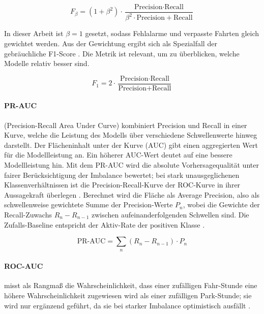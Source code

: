 \begin{equation}
  F_\beta = (1 + \beta^2) \cdot \frac{\text{Precision} \cdot \text{Recall}}{\beta^2 \cdot \text{Precision} + \text{Recall}}
\end{equation}

In dieser Arbeit ist $\beta = 1$ gesetzt, sodass Fehlalarme und verpasste Fahrten gleich gewichtet werden. Aus der Gewichtung ergibt sich als Spezialfall der gebräuchliche F1-Score \parencite[Kap. 7]{vanrijsbergen1979}. Die Metrik ist relevant, um zu überblicken, welche Modelle relativ besser sind.

\begin{equation}
  F_1 = 2 \cdot \frac{\text{Precision} \cdot \text{Recall}}{\text{Precision} + \text{Recall}}
\end{equation}

\paragraph{PR-AUC} (Precision-Recall Area Under Curve) kombiniert Precision und Recall in einer Kurve, welche die Leistung des Modells über verschiedene Schwellenwerte hinweg darstellt. Der Flächeninhalt unter der Kurve (AUC) gibt einen aggregierten Wert für die Modellleistung an. Ein höherer AUC-Wert deutet auf eine bessere Modellleistung hin. Mit dem PR-AUC wird die absolute Vorhersagequalität unter fairer Berücksichtigung der Imbalance bewertet; bei stark unausgeglichenen Klassenverhältnissen ist die Precision-Recall-Kurve der ROC-Kurve in ihrer Aussagekraft überlegen \parencite{davis2006relationship,saito2015prauc}. Berechnet wird die Fläche als Average Precision, also als schwellenweise gewichtete Summe der Precision-Werte $P_n$, wobei die Gewichte der Recall-Zuwachs $R_n - R_{n-1}$ zwischen aufeinanderfolgenden Schwellen sind. Die Zufalls-Baseline entspricht der Aktiv-Rate der positiven Klasse \parencite{saito2015prauc}.

\begin{equation}
  \text{PR-AUC} = \sum_{n} (R_n - R_{n-1}) \cdot P_n
\end{equation}


\paragraph{ROC-AUC} misst als Rangmaß die Wahrscheinlichkeit, dass einer zufälligen Fahr-Stunde eine höhere Wahrscheinlichkeit zugewiesen wird als einer zufälligen Park-Stunde; sie wird nur ergänzend geführt, da sie bei starker Imbalance optimistisch ausfällt \parencite{davis2006relationship,fawcett2006roc}.

